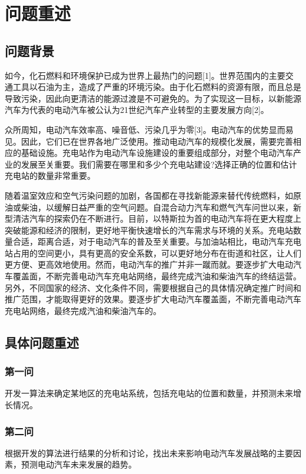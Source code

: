 \documentclass[12pt, a4paper, oneside]{ctexart}
\begin{document}
\begin{abstract}

\end{abstract}
\newpage
\section{问题重述}
\subsection{问题背景}
如今，化石燃料和环境保护已成为世界上最热门的问题[1]。世界范围内的主要交通工具以石油为主，造成了严重的环境污染。由于化石燃料的资源有限，而且总是导致污染，因此向更清洁的能源过渡是不可避免的。为了实现这一目标，以新能源汽车为代表的电动汽车被公认为21世纪汽车产业转型的主要发展方向[2]。

众所周知，电动汽车效率高、噪音低、污染几乎为零[3]。电动汽车的优势显而易见。因此，它们已在世界各地广泛使用。推动电动汽车的规模化发展，需要完善相应的基础设施。充电站作为电动汽车设施建设的重要组成部分，对整个电动汽车产业的发展至关重要。我们需要在哪里和多少个充电站建设?选择正确的位置和估计充电站的数量非常重要。

随着温室效应和空气污染问题的加剧，各国都在寻找新能源来替代传统燃料，如原油或柴油，以缓解日益严重的空气问题。自混合动力汽车和燃气汽车问世以来，新型清洁汽车的探索仍在不断进行。目前，以特斯拉为首的电动汽车将在更大程度上突破能源和经济的限制，更好地平衡快速增长的汽车需求与环境的关系。充电站数量合适，距离合适，对于电动汽车的普及至关重要。与加油站相比，电动汽车充电站占用的空间更小，具有更高的安全系数，可以更好地分布在街道和社区，让人们更方便、更高效地使用。然而，电动汽车的推广并非一蹴而就。要逐步扩大电动汽车覆盖面，不断完善电动汽车充电站网络，最终完成汽油和柴油汽车的终结运营。另外，不同国家的经济、文化条件不同，需要根据自己的具体情况确定推广时间和推广范围，才能取得更好的效果。要逐步扩大电动汽车覆盖面，不断完善电动汽车充电站网络，最终完成汽油和柴油汽车的。
\subsection{具体问题重述}
\subsubsection{第一问}
开发一算法来确定某地区的充电站系统，包括充电站的位置和数量，并预测未来增长情况。

\subsubsection{第二问}
根据开发的算法进行结果的分析和讨论，找出未来影响电动汽车发展战略的主要因素，预测电动汽车未来发展的趋势。
\end{document}
